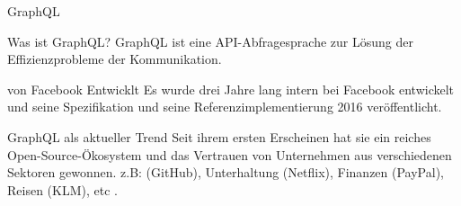 \begin{frame}{GraphQL}

    \footnotesize

    \begin{block}{Was ist GraphQL?}
        GraphQL ist eine API-Abfragesprache zur Lösung der Effizienzprobleme der Kommunikation\cite{gql-iot}.         
    \end{block}

    \begin{block}{von Facebook Entwicklt}
        Es wurde drei Jahre lang intern bei Facebook entwickelt und seine Spezifikation und seine Referenzimplementierung 2016 veröffentlicht.
        \cite{initial-analysis-of-gql}
    \end{block}

    \begin{block}{GraphQL als aktueller Trend}
        Seit ihrem ersten Erscheinen hat sie ein reiches Open-Source-Ökosystem und das Vertrauen von Unternehmen aus verschiedenen Sektoren gewonnen. z.B: (GitHub), Unterhaltung (Netflix), Finanzen (PayPal), Reisen (KLM), etc \cite{morph-gql-1,gql-healthcare}.
    \end{block}

\end{frame}






